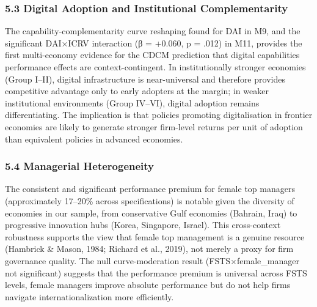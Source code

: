 \documentclass[12pt,a4paper]{article}
\begin{document}
\hypertarget{53-digital-adoption-and-institutional-complementarity}{%
\subsubsection{5.3 Digital Adoption and Institutional
Complementarity}\label{53-digital-adoption-and-institutional-complementarity}}

The capability-complementarity curve reshaping found for DAI in M9, and
the significant DAI×ICRV interaction (β = +0.060, p = .012) in M11,
provides the first multi-economy evidence for the CDCM prediction that
digital capabilities\textquotesingle{} performance effects are
context-contingent. In institutionally stronger economies (Group I--II),
digital infrastructure is near-universal and therefore provides
competitive advantage only to early adopters at the margin; in weaker
institutional environments (Group IV--VI), digital adoption remains
differentiating. The implication is that policies promoting
digitalisation in frontier economies are likely to generate stronger
firm-level returns per unit of adoption than equivalent policies in
advanced economies.

\hypertarget{54-managerial-heterogeneity}{%
\subsubsection{5.4 Managerial
Heterogeneity}\label{54-managerial-heterogeneity}}

The consistent and significant performance premium for female top
managers (approximately 17--20\% across specifications) is notable given
the diversity of economies in our sample, from conservative Gulf
economies (Bahrain, Iraq) to progressive innovation hubs (Korea,
Singapore, Israel). This cross-context robustness supports the view that
female top management is a genuine resource (Hambrick \& Mason, 1984;
Richard et al., 2019), not merely a proxy for firm governance quality.
The null curve-moderation result (FSTS×female\_manager not significant)
suggests that the performance premium is universal across FSTS levels,
female managers improve absolute performance but do not help firms
navigate internationalization more efficiently.
\end{document}
